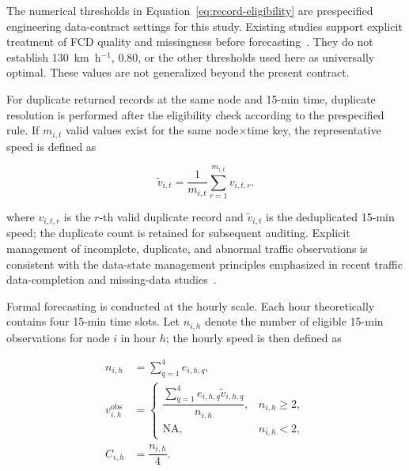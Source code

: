 \documentclass[pdflatex,sn-mathphys-num,iicol]{sn-jnl}
\begin{document}
The numerical thresholds in Equation~\ref{eq:record-eligibility} are prespecified engineering data-contract settings for this study. Existing studies support explicit treatment of FCD quality and missingness before forecasting~\cite{Ipekyuz2025FCD,Xu2023AGNP,Zhang2024MissingData,Chan2023MissingTrafficData}. They do not establish 130~km~h$^{-1}$, 0.80, or the other thresholds used here as universally optimal. These values are not generalized beyond the present contract.

For duplicate returned records at the same node and 15-min time, duplicate resolution is performed after the eligibility check according to the prespecified rule. If $m_{i,t}$ valid values exist for the same node$\times$time key, the representative speed is defined as

\begin{equation}
\tilde{v}_{i,t}
=
\frac{1}{m_{i,t}}
\sum_{r=1}^{m_{i,t}}
v_{i,t,r}.
\label{eq:duplicate-resolution}
\end{equation}

where $v_{i,t,r}$ is the $r$-th valid duplicate record and $\tilde{v}_{i,t}$ is the deduplicated 15-min speed; the duplicate count is retained for subsequent auditing. Explicit management of incomplete, duplicate, and abnormal traffic observations is consistent with the data-state management principles emphasized in recent traffic data-completion and missing-data studies~\cite{Chen2024TrafficCompletion,Bikram2024Imputation,Chan2023MissingTrafficData}.

Formal forecasting is conducted at the hourly scale. Each hour theoretically contains four 15-min time slots. Let $n_{i,h}$ denote the number of eligible 15-min observations for node $i$ in hour $h$; the hourly speed is then defined as

\begin{equation}
\begin{aligned}
n_{i,h}
&=
\sum_{q=1}^{4} e_{i,h,q},
\\[4pt]
v^{\mathrm{obs}}_{i,h}
&=
\begin{cases}
\dfrac{\displaystyle\sum_{q=1}^{4}
e_{i,h,q}\tilde{v}_{i,h,q}}
{n_{i,h}},
&
n_{i,h}\geq2,
\\[10pt]
\mathrm{NA},
&
n_{i,h}<2,
\end{cases}
\\[6pt]
C_{i,h}
&=
\dfrac{n_{i,h}}{4}.
\end{aligned}
\label{eq:hourly-aggregation}
\end{equation}
\end{document}
